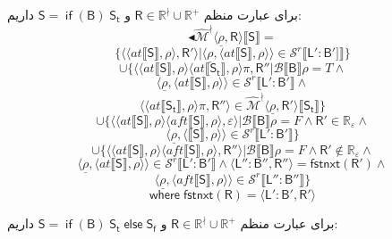 برای عبارت منظم 
$\mathsf{R} \in \mathbb{R}^\nmid \cup \mathbb{R^+}$
و 
$\mathsf{S= \; if \; (B) \; S_t}$
داریم:
$$\blacktriangleleft\mathcal{\hat{M}^\nmid} \langle \underline{\rho},\mathsf{R} \rangle \llbracket \mathsf{S} \rrbracket=$$
$$\{\langle \langle at \llbracket \mathsf{S} \rrbracket , \rho \rangle , \mathsf{R'} \rangle | \langle \underline{\rho} , \langle at \llbracket \mathsf{S} \rrbracket , \rho \rangle \rangle \in \mathcal{S}^r \llbracket \mathsf{L':B'} ]\rrbracket \}$$
$$\cup \{\langle \langle at \llbracket \mathsf{S} \rrbracket , \rho \rangle \langle at \llbracket \mathsf{S_t} \rrbracket, \rho \rangle \pi, \mathsf{R''} | \mathcal{B}\llbracket\mathsf{B} \rrbracket \rho = \mathit{T} \land$$
$$\langle \underline{\rho},\langle at \llbracket \mathsf{S} \rrbracket , \rho \rangle \rangle \in \mathcal{S}^r \llbracket \mathsf{L':B'} \rrbracket \land$$
$$\langle \langle at \llbracket \mathsf{S_t} \rrbracket , \rho \rangle \pi,\mathsf{R''} \rangle \in \mathcal{\hat{M}^\nmid} \langle \underline{\rho}, \mathsf{R'} \rangle\llbracket \mathsf{S_t} \rrbracket \}$$
$$\cup \{\langle \langle at \llbracket \mathsf{S} \rrbracket, \rho \rangle \langle aft \llbracket \mathsf{S} \rrbracket , \rho \rangle , \varepsilon \rangle | \mathcal{B}\llbracket \mathsf{B} \rrbracket \rho = \mathit{F} \land \mathsf{R'} \in \mathbb{R_\varepsilon} \land$$
$$\langle \underline{\rho} , \langle \llbracket \mathsf{S} \rrbracket , \rho \rangle \rangle \in \mathcal{S}^r \llbracket \mathsf{L':B'} \rrbracket\}$$
$$\cup \{\langle \langle at \llbracket \mathsf{S} \rrbracket , \rho \rangle \langle aft \llbracket \mathsf{S} \rrbracket , \rho \rangle , \mathsf{R''} \rangle | \mathcal{B} \llbracket \mathsf{B} \rrbracket \rho = \mathit{F} \land \mathsf{R'} \notin \mathbb{R_\varepsilon} \land$$
$$\langle \underline{\rho}, \langle at \llbracket \mathsf{S} \rrbracket , \rho \rangle \rangle \in \mathcal{S}^r\llbracket \mathsf{L':B'} \rrbracket \land \langle \mathsf{L'':B''} , \mathsf{R''} \rangle = \mathsf{fstnxt(R')} \land$$
$$\langle \underline{\rho}, \langle aft \llbracket \mathsf{S} \rrbracket , \rho \rangle \rangle \in \mathcal{S}^r \llbracket \mathsf{L'':B''} \rrbracket \}$$
$$\mathsf{where\; fstnxt(R)=\langle L':B', R' \rangle}$$


برای عبارت منظم 
$\mathsf{R} \in \mathbb{R}^\nmid \cup \mathbb{R^+}$
و 
$\mathsf{S= \; if \; (B) \; S_t \; else \; S_f}$
داریم:

